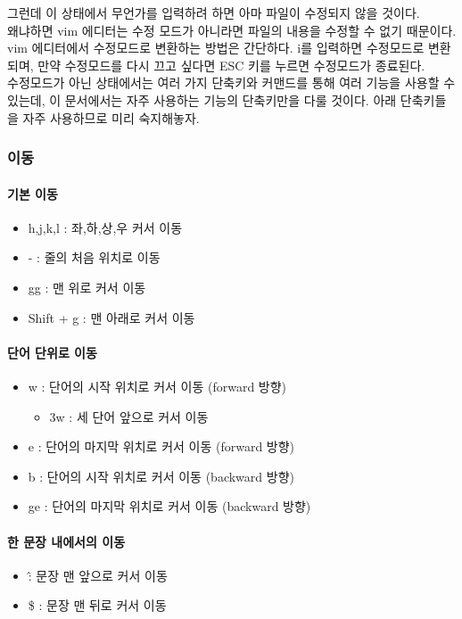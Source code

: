 그런데 이 상태에서 무언가를 입력하려 하면 아마 파일이 수정되지 않을 것이다.\\
왜냐하면 vim 에디터는 수정 모드가 아니라면 파일의 내용을 수정할 수 없기 때문이다.\\
vim 에디터에서 수정모드로 변환하는 방법은 간단하다. i를 입력하면 수정모드로 변환되며, 만약 수정모드를 다시 끄고 싶다면 ESC 키를 누르면 수정모드가 종료된다.\\
수정모드가 아닌 상태에서는 여러 가지 단축키와 커맨드를 통해 여러 기능을 사용할 수 있는데, 이 문서에서는 자주 사용하는 기능의 단축키만을 다룰 것이다. 아래 단축키들을 자주 사용하므로 미리 숙지해놓자.\\

\subsubsection{이동}
\paragraph{기본 이동}
\begin{itemize}[$\bullet$]
    \item h,j,k,l : 좌,하,상,우 커서 이동
    \item - : 줄의 처음 위치로 이동
    \item gg : 맨 위로 커서 이동
    \item Shift + g : 맨 아래로 커서 이동
\end{itemize}
\paragraph{단어 단위로 이동}
\begin{itemize}[$\bullet$]
    \item w : 단어의 시작 위치로 커서 이동 (forward 방향)
        \begin{itemize}[Ex)]
            \item 3w : 세 단어 앞으로 커서 이동
        \end{itemize}
    \item e : 단어의 마지막 위치로 커서 이동 (forward 방향)
    \item b : 단어의 시작 위치로 커서 이동 (backward 방향)
    \item ge : 단어의 마지막 위치로 커서 이동 (backward 방향)
\end{itemize}
\paragraph{한 문장 내에서의 이동}
\begin{itemize}[$\bullet$]
    \item \^ : 문장 맨 앞으로 커서 이동
    \item \$ : 문장 맨 뒤로 커서 이동
\end{itemize}
